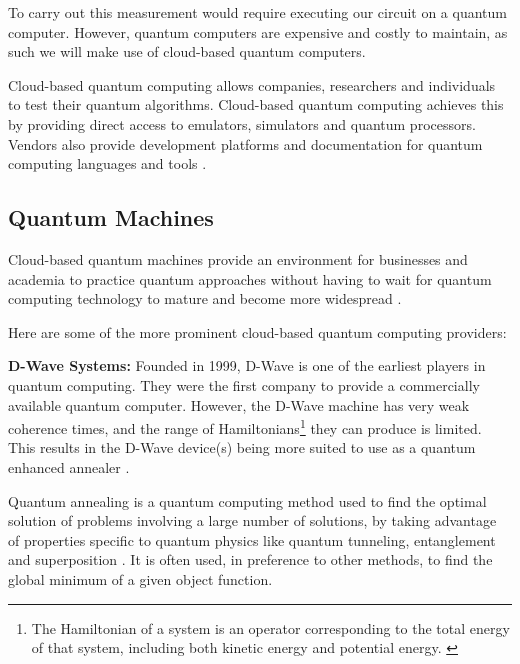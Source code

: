 To carry out this measurement would require executing our circuit on a quantum computer. However, quantum computers are expensive and costly to maintain, as such we will make use of cloud-based quantum computers. 


Cloud-based quantum computing allows companies, researchers and individuals to test their quantum algorithms. Cloud-based quantum computing achieves this by providing direct access to emulators, simulators and quantum processors. Vendors also provide development platforms and documentation for quantum computing languages and tools \citep{QCloudC}.

\subsection{Quantum Machines}

Cloud-based quantum machines provide an environment for businesses and academia to practice quantum approaches without having to wait for quantum computing technology to mature and become more widespread \citep{QCloudC}.

Here are some of the more prominent cloud-based quantum computing providers:

\textbf{D-Wave Systems:} Founded in 1999, D-Wave is one of the earliest players in quantum computing. They were the first company to provide a commercially available quantum computer. However, the D-Wave machine has very weak coherence times, and the range of Hamiltonians\footnote{The Hamiltonian of a system is an operator corresponding to the total energy of that system, including both kinetic energy and potential energy. \citep{wikiHamilton}} %
 they can produce is limited. This results in the D-Wave device(s) being more suited to use as a quantum enhanced annealer \citep{QCloudC}.

Quantum annealing is a quantum computing method used to find the optimal solution of problems involving a large number of solutions, by taking advantage of properties specific to quantum physics like quantum tunneling, entanglement and superposition \citep{QAnnealing}. It is often used, in preference to other methods, to find the global minimum of a given object function.

